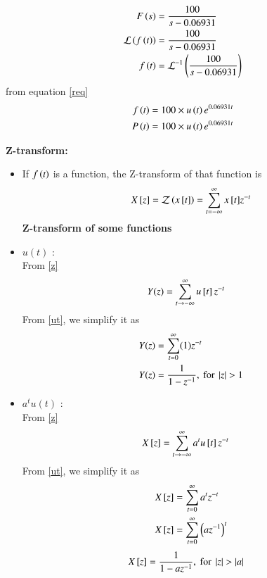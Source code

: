 \documentclass[journal]{IEEEtran}
\numberwithin{equation}{enumi}
\numberwithin{figure}{enumi}
\begin{document}
\begin{itemize}
\begin{align}
        F\left(s\right) &= \frac{100}{s - 0.06931}\\
        \mathcal{L}\left(f\left(t\right)\right) &= \frac{100}{s - 0.06931}\\
        f\left(t\right) &= \mathcal{L}^{-1}\left(\frac{100}{s - 0.06931}\right)\\
    \end{align}
    from equation \eqref{req}
    \begin{align}
        f\left(t\right) &= 100\times u\left(t\right)e^{0.06931t}\\
        P\left(t\right) &= 100\times u\left(t\right)e^{0.06931t}
    \end{align}
\end{itemize}

\textbf{Z-transform:}
\begin{itemize}
    \item If $f\left(t\right)$ is a function, the Z-transform of that function is
    \begin{align}
        X{}\left[z\right] = \mathcal{Z}\left(x{}\left[t\right]\right) = \sum_{t = -\infty}^{\infty} {x{}\left[t\right]}z^{-t} \label{z}
    \end{align}
    \textbf{Z-transform of some functions}
    \item \textbf{$u(t)$} : \\
		From \eqref{z}
		\begin{align}
			Y(z) &= \sum_{t \to -\infty}^{\infty} u{}\left[t\right] z^{-t} 
		\end{align}
		From \eqref{ut}, we simplify it as
		\begin{align}
		        Y(z) &= \sum_{t=0}^{\infty} (1)z^{-t} \\
			Y(z) &= \frac{1}{1 - z^{-1}}, \label{eq:zut} \text{ for } \left\vert z\right\vert > 1 
		\end{align}
	   \item \textbf{$a^t u(t)$} : \\
		From \eqref{z} 
		\begin{align}
			X{}\left[z\right] &= \sum_{t \to -\infty}^{\infty} a^t u{}\left[t\right] z^{-t} 
		\end{align}
		From \eqref{ut}, we simplify it as
		\begin{align}
			X{}\left[z\right] &= \sum_{t=0}^{\infty} a^t z^{-t} \\
			X{}\left[z\right] &= \sum_{t=0}^{\infty} \left(az^{-1}\right)^{t} 
            \end{align}
            \begin{align}
			X{}\left[z\right] &= \frac{1}{1 - az^{-1}}, \text{ for } \left\vert z\right\vert > \left\vert a\right\vert \label{eq:atut}
		\end{align}

\end{itemize}
\end{document}
